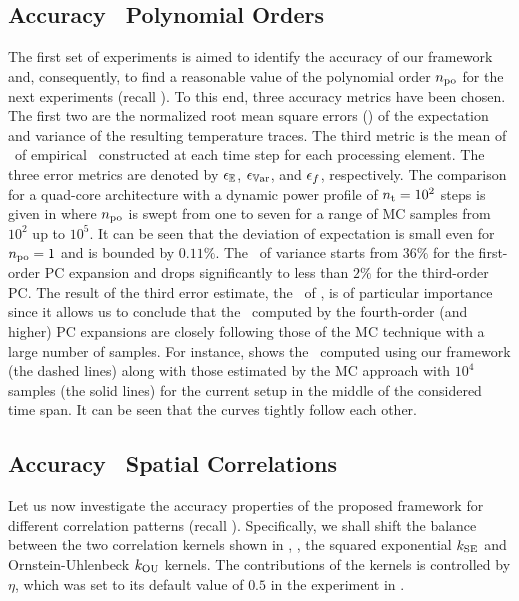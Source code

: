 \subsection{Accuracy \versus\ Polynomial Orders} 
The first set of experiments is aimed to identify the accuracy of our framework and, consequently, to find a reasonable value of the polynomial order ${n_\text{po}}$ for the next experiments (recall ).
To this end, three accuracy metrics have been chosen.
The first two are the normalized root mean square errors (\nrmses) of the expectation and variance of the resulting temperature traces.
The third metric is the mean of \nrmses\ of empirical \pdfs\ constructed at each time step for each processing element.
The three error metrics are denoted by $\epsilon_\mathbb{E}$, $\epsilon_{\mathbb{V}\text{ar}}$, and $\epsilon_f$, respectively.
The comparison for a quad-core architecture with a dynamic power profile of ${n_\text{t}} = 10^2$ steps is given in  where ${n_\text{po}}$ is swept from one to seven for a range of MC samples from $10^2$ up to $10^5$.
It can be seen that the deviation of expectation is small even for ${n_\text{po}} = 1$ and is bounded by $0.11\%$.
The \nrmse\ of variance starts from $36\%$ for the first-order PC expansion and drops significantly to less than $2\%$ for the third-order PC.
The result of the third error estimate, the \nrmses\ of \pdfs, is of particular importance since it allows us to conclude that the \pdfs\ computed by the fourth-order (and higher) PC expansions are closely following those of the MC technique with a large number of samples.
For instance,  shows the \pdfs\ computed using our framework (the dashed lines) along with those estimated by the MC approach with $10^4$ samples (the solid lines) for the current setup in the middle of the considered time span.
It can be seen that the curves tightly follow each other.


\subsection{Accuracy \versus\ Spatial Correlations}
Let us now investigate the accuracy properties of the proposed framework for different correlation patterns (recall ).
Specifically, we shall shift the balance between the two correlation kernels shown in , \ie, the squared exponential $\fCorr_\SE$ and Ornstein-Uhlenbeck $\fCorr_\OU$ kernels.
The contributions of the kernels is controlled by $\eta$, which was set to its default value of $0.5$ in the experiment in .

